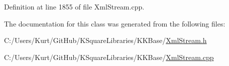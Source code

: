 Definition at line 1855 of file Xml\+Stream.\+cpp.



The documentation for this class was generated from the following files\+:\begin{DoxyCompactItemize}
\item 
C\+:/\+Users/\+Kurt/\+Git\+Hub/\+K\+Square\+Libraries/\+K\+K\+Base/\hyperlink{_xml_stream_8h}{Xml\+Stream.\+h}\item 
C\+:/\+Users/\+Kurt/\+Git\+Hub/\+K\+Square\+Libraries/\+K\+K\+Base/\hyperlink{_xml_stream_8cpp}{Xml\+Stream.\+cpp}\end{DoxyCompactItemize}
